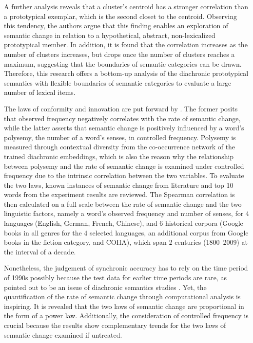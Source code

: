 A further analysis reveals that a cluster's centroid has a stronger correlation than a prototypical exemplar, which is the second closet to the centroid. Observing this tendency, the authors argue that this finding enables an exploration of semantic change in relation to a hypothetical, abstract, non-lexicalized prototypical member. In addition, it is found that the correlation increases as the number of clusters increases, but drops once the number of clusters reaches a maximum, suggesting that the boundaries of semantic categories can be drawn. Therefore, this research offers a bottom-up analysis of the diachronic prototypical semantics with flexible boundaries of semantic categories to evaluate a large number of lexical items.

The laws of conformity and innovation are put forward by \textcite{hamilton2016law}. The former posits that observed frequency negatively correlates with the rate of semantic change, while the latter asserts that semantic change is positively influenced by a word's polysemy, the number of a word's senses, in controlled frequency. Polysemy is measured through contextual diversity from the co-occurrence network of the trained diachronic embeddings, which is also the reason why the relationship between polysemy and the rate of semantic change is examined under controlled frequency due to the intrinsic correlation between the two variables. To evaluate the two laws, known instances of semantic change from literature and top 10 words from the experiment results are reviewed. The Spearman correlation is then calculated on a full scale between the rate of semantic change and the two linguistic factors, namely a word's observed frequency and number of senses, for 4 languages (English, German, French, Chinese), and 6 historical corpora (Google books in all genres for the 4 selected languages, an additional corpus from Google books in the fiction category, and COHA), which span 2 centuries (1800--2009) at the interval of a decade. 

Nonetheless, the judgement of synchronic accuracy has to rely on the time period of 1990s possibly because the test data for earlier time periods are rare, as pointed out to be an issue of diachronic semantics studies \parencite{wevers2020digital}. Yet, the quantification of the rate of semantic change through computational analysis is inspiring. It is revealed that the two laws of semantic change are proportional in the form of a power law. Additionally, the consideration of controlled frequency is crucial because the results show complementary trends for the two laws of semantic change examined if untreated.

